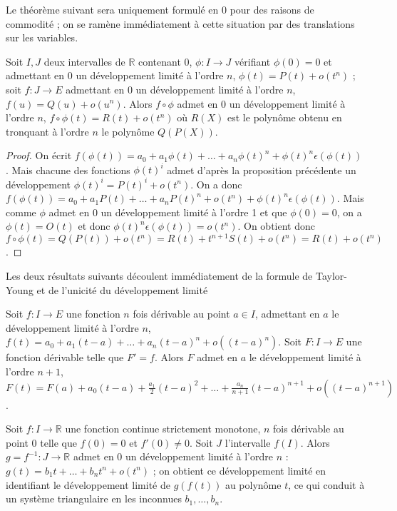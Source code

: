 Le théorème suivant sera uniquement formulé en 0 pour des raisons de commodité ; on se ramène immédiatement à cette situation par des translations sur les variables.

\begin{thm}
Soit $I,J$ deux intervalles de $\mathbb{R}$ contenant 0, $\phi : I \rightarrow J$ vérifiant $\phi(0) = 0$ et admettant en 0 un développement limité à l'ordre $n$, $\phi(t) = P(t) + o(t^n)$ ; soit $f : J \rightarrow E$ admettant en 0 un développement limité à l'ordre $n$, $f(u) = Q(u) + o(u^n)$. Alors $f \circ \phi$ admet en 0 un développement limité à l'ordre $n$, $f \circ \phi(t) = R(t) + o(t^n)$ où $R(X)$ est le polynôme obtenu en tronquant à l'ordre $n$ le polynôme $Q(P(X))$.
\end{thm}

\begin{proof}
On écrit $f(\phi(t)) = a_0 + a_1\phi(t) + \ldots + a_n\phi(t)^n + \phi(t)^n\epsilon(\phi(t))$. Mais chacune des fonctions $\phi(t)^i$ admet d'après la proposition précédente un développement $\phi(t)^i = P(t)^i + o(t^n)$. On a donc $f(\phi(t)) = a_0 + a_1P(t) + \ldots + a_nP(t)^n + o(t^n) + \phi(t)^n\epsilon(\phi(t))$. Mais comme $\phi$ admet en 0 un développement limité à l'ordre 1 et que $\phi(0) = 0$, on a $\phi(t) = O(t)$ et donc $\phi(t)^n\epsilon(\phi(t)) = o(t^n)$. On obtient donc $f \circ \phi(t) = Q(P(t)) + o(t^n) = R(t) + t^{n+1}S(t) + o(t^n) = R(t) + o(t^n)$.
\end{proof}

Les deux résultats suivants découlent immédiatement de la formule de Taylor-Young et de l'unicité du développement limité

\begin{prop}
Soit $f : I \rightarrow E$ une fonction $n$ fois dérivable au point $a \in I$, admettant en $a$ le développement limité à l'ordre $n$, $f(t) = a_0 + a_1(t - a) + \ldots + a_n(t - a)^n + o((t - a)^n)$. Soit $F : I \rightarrow E$ une fonction dérivable telle que $F' = f$. Alors $F$ admet en $a$ le développement limité à l'ordre $n + 1$, $F(t) = F(a) + a_0(t - a) + \frac{a_1}{2}(t - a)^2 + \ldots + \frac{a_n}{n+1}(t - a)^{n+1} + o((t - a)^{n+1})$.
\end{prop}

\begin{prop}
Soit $f : I \rightarrow \mathbb{R}$ une fonction continue strictement monotone, $n$ fois dérivable au point 0 telle que $f(0) = 0$ et $f'(0) \neq 0$. Soit $J$ l'intervalle $f(I)$. Alors $g = f^{-1} : J \rightarrow \mathbb{R}$ admet en 0 un développement limité à l'ordre $n$ : $g(t) = b_1t + \ldots + b_nt^n + o(t^n)$ ; on obtient ce développement limité en identifiant le développement limité de $g(f(t))$ au polynôme $t$, ce qui conduit à un système triangulaire en les inconnues $b_1, \ldots, b_n$.
\end{prop}

